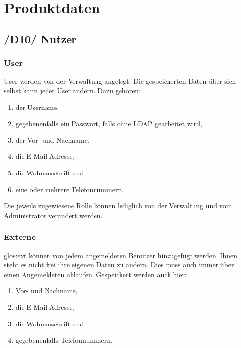
\chapter{Produktdaten}

\section{/D10/ Nutzer}
\subsection{User}
User werden von der Verwaltung angelegt. Die gespeicherten Daten über sich selbst kann jeder User ändern. Dazu gehören: 
\begin{enumerate}
	\item der Username, 
	\item gegebenenfalls ein Passwort, falls ohne \gls{LDAP} gearbeitet wird,
	\item der Vor- und Nachname, 
	\item die E-Mail-Adresse, 
	\item die Wohnanschrift und 
	\item eine oder mehrere Telefonnummern. 
\end{enumerate} 
Die jeweils zugewiesene Rolle können lediglich von der Verwaltung und vom Administrator verändert werden.

\subsection{Externe}
\gls{glos:ext} können von jedem angemeldeten Benutzer hinzugefügt werden. Ihnen steht es nicht frei ihre eigenen Daten zu ändern. Dies muss auch immer über einen Angemeldeten ablaufen. Gespeichert werden auch hier: 
\begin{enumerate}
	\item Vor- und Nachname, 
	\item die E-Mail-Adresse, 
	\item die Wohnanschrift und 
	\item gegebenenfalls Telefonnummern.
\end{enumerate}

